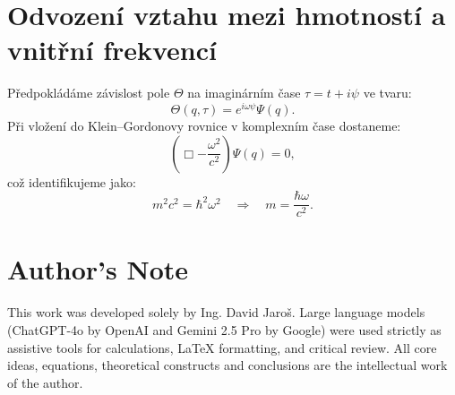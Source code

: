 \documentclass{article}
\begin{document}
\section*{Odvození vztahu mezi hmotností a vnitřní frekvencí}

Předpokládáme závislost pole \(\Theta\) na imaginárním čase \(\tau = t + i\psi\) ve tvaru:
\[
\Theta(q, \tau) = e^{i\omega \psi} \Psi(q).
\]
Při vložení do Klein–Gordonovy rovnice v komplexním čase dostaneme:
\[
\left( \Box - \frac{\omega^2}{c^2} \right) \Psi(q) = 0,
\]
což identifikujeme jako:
\[
m^2 c^2 = \hbar^2 \omega^2 \quad \Rightarrow \quad m = \frac{\hbar \omega}{c^2}.
\]


\section*{Author's Note}

This work was developed solely by Ing. David Jaroš.  
Large language models (ChatGPT-4o by OpenAI and Gemini 2.5 Pro by Google) were used strictly as assistive tools for calculations, LaTeX formatting, and critical review.  
All core ideas, equations, theoretical constructs and conclusions are the intellectual work of the author.
\end{document}
